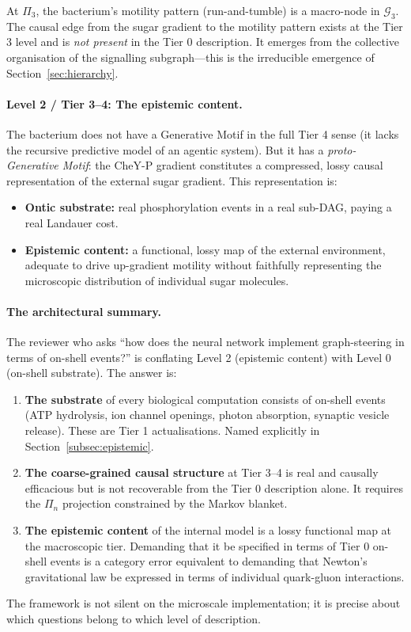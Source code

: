 \documentclass[11pt,a4paper]{article}
\theoremstyle{remark}
\newcommand{\GG}{\mathcal{G}}
\begin{document}
At $\Pi_3$, the bacterium's motility pattern (run-and-tumble) is a
macro-node in $\GG_3$. The causal edge from the sugar gradient to the
motility pattern exists at the Tier 3 level and is \emph{not present}
in the Tier 0 description. It emerges from the collective organisation of
the signalling subgraph---this is the irreducible emergence of
Section~\ref{sec:hierarchy}.

\paragraph{Level 2 / Tier 3--4: The epistemic content.}
The bacterium does not have a Generative Motif in the full Tier 4 sense
(it lacks the recursive predictive model of an agentic system). But it has
a \emph{proto-Generative Motif}: the CheY-P gradient constitutes a
compressed, lossy causal representation of the external sugar gradient.
This representation is:
\begin{itemize}[noitemsep]
  \item \textbf{Ontic substrate:} real phosphorylation events in a real
  sub-DAG, paying a real Landauer cost.
  \item \textbf{Epistemic content:} a functional, lossy map of the external
  environment, adequate to drive up-gradient motility without faithfully
  representing the microscopic distribution of individual sugar molecules.
\end{itemize}

\paragraph{The architectural summary.}
The reviewer who asks ``how does the neural network implement graph-steering
in terms of on-shell events?'' is conflating Level 2 (epistemic content)
with Level 0 (on-shell substrate). The answer is:
\begin{enumerate}[noitemsep]
  \item \textbf{The substrate} of every biological computation consists of
  on-shell events (ATP hydrolysis, ion channel openings, photon absorption,
  synaptic vesicle release). These are Tier 1 actualisations. Named
  explicitly in Section~\ref{subsec:epistemic}.
  \item \textbf{The coarse-grained causal structure} at Tier 3--4 is
  real and causally efficacious but is not recoverable from the Tier 0
  description alone. It requires the $\Pi_n$ projection constrained by
  the Markov blanket.
  \item \textbf{The epistemic content} of the internal model is a lossy
  functional map at the macroscopic tier. Demanding that it be specified
  in terms of Tier 0 on-shell events is a category error equivalent to
  demanding that Newton's gravitational law be expressed in terms of
  individual quark-gluon interactions.
\end{enumerate}
The framework is not silent on the microscale implementation; it is
precise about which questions belong to which level of description.
\end{document}
